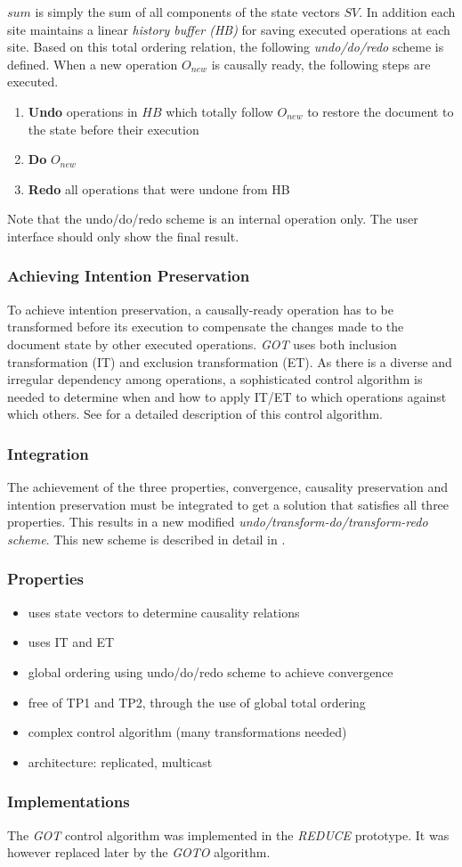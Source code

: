 $sum$ is simply the sum of all components of the state vectors $SV$. In addition each site maintains a linear \emph{history buffer (HB)} for saving executed operations at each site. Based on this total ordering relation, the following \emph{undo/do/redo} scheme is defined. When a new operation $O_{new}$ is causally ready, the following steps are executed.

\begin{enumerate}
 \item \textbf{Undo} operations in $HB$ which totally follow $O_{new}$ to 
       restore the document to the state before their execution
 \item \textbf{Do} $O_{new}$
 \item \textbf{Redo} all operations that were undone from HB
\end{enumerate}

Note that the undo/do/redo scheme is an internal operation only. The user interface should only show the final result.


\subsubsection{Achieving Intention Preservation}
To achieve intention preservation, a causally-ready operation has to be transformed before its execution to compensate the changes made to the document state by other executed operations. \emph{GOT} uses both inclusion transformation (IT) and exclusion transformation (ET). As there is a diverse and irregular dependency among operations, a sophisticated control algorithm is needed to determine when and how to apply IT/ET to which operations against which others. See \cite{sun98a} for a detailed description of this control algorithm.


\subsubsection{Integration}
The achievement of the three properties, convergence, causality preservation and intention preservation must be integrated to get a solution that satisfies all three properties. This results in a new modified \emph{undo/transform-do/transform-redo scheme}. This new scheme is described in detail in \cite{sun98a}.


\subsubsection{Properties}
\begin{itemize}
 \item uses state vectors to determine causality relations
 \item uses IT and ET
 \item global ordering using undo/do/redo scheme to achieve convergence
 \item free of TP1 and TP2, through the use of global total ordering
 \item complex control algorithm (many transformations needed)
 \item architecture: replicated, multicast
\end{itemize}


\subsubsection{Implementations}
The \emph{GOT} control algorithm was implemented in the \emph{REDUCE} \cite{sun00a} prototype. It was however replaced later by the \emph{GOTO} algorithm.


